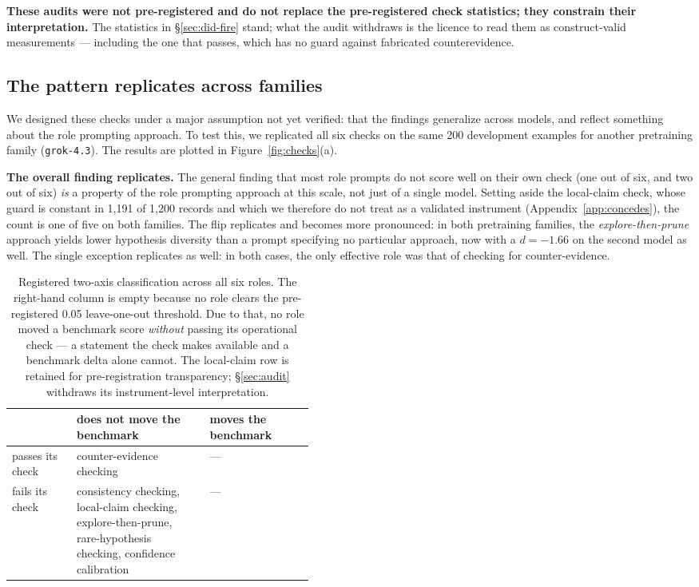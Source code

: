 \textbf{These audits were not pre-registered and do not replace the pre-registered check statistics;
they constrain their interpretation.} The statistics in \S\ref{sec:did-fire} stand; what the audit
withdraws is the licence to read them as construct-valid measurements --- including the one that
passes, which has no guard against fabricated counterevidence.

\subsection{The pattern replicates across families}
\label{sec:replication}

We designed these checks under a major assumption not yet verified: that the findings generalize
across models, and reflect something about the role prompting approach. To test this, we replicated
all six checks on the same 200 development examples for another pretraining family
(\texttt{grok-4.3}). The results are plotted in Figure~\ref{fig:checks}(a).

\textbf{The overall finding replicates.} The general finding that most role prompts do not score
well on their own check (one out of six, and two out of six) \emph{is} a property of the role
prompting approach at this scale, not just of a single model. Setting aside the local-claim check,
whose guard is constant in 1,191 of 1,200 records and which we therefore do not treat as a validated
instrument (Appendix~\ref{app:concedes}), the count is one of five on both families. The flip
replicates and becomes more pronounced: in both pretraining families, the \emph{explore-then-prune}
approach yields lower hypothesis diversity than a prompt specifying no particular approach, now with
a $d = -1.66$ on the second model as well. The single exception replicates as well: in both cases,
the only effective role was that of checking for counter-evidence.

\begin{table}[t]
\centering
\small
\begin{tabular}{lp{0.44\linewidth}l}
\toprule
 & does not move the benchmark & moves the benchmark \\
\midrule
passes its check & counter-evidence checking & --- \\
fails its check  & consistency checking, local-claim checking, explore-then-prune,
                   rare-hypothesis checking, confidence calibration & --- \\
\bottomrule
\end{tabular}
\caption{Registered two-axis classification across all six roles. The right-hand column is empty
because no role clears the pre-registered 0.05 leave-one-out threshold. Due to that, no role moved a
benchmark score \emph{without} passing its operational check --- a statement the check makes
available and a benchmark delta alone cannot. The local-claim row is retained for pre-registration
transparency; \S\ref{sec:audit} withdraws its instrument-level interpretation.}
\label{tab:twoaxis}
\end{table}

